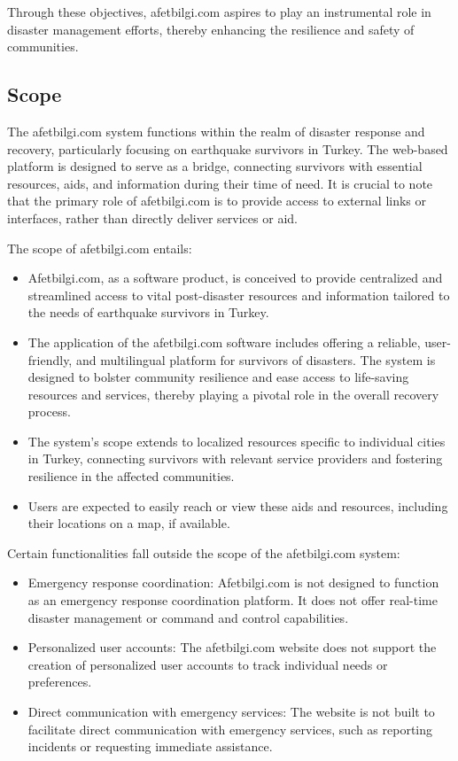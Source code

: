 \documentclass[12pt, letterpaper]{article}
\begin{document}
Through these objectives, afetbilgi.com aspires to play an instrumental role in disaster management efforts, thereby enhancing the resilience and safety of communities.

\subsection{Scope}

The afetbilgi.com system functions within the realm of disaster response and recovery, particularly focusing on earthquake survivors in Turkey. The web-based platform is designed to serve as a bridge, connecting survivors with essential resources, aids, and information during their time of need. It is crucial to note that the primary role of afetbilgi.com is to provide access to external links or interfaces, rather than directly deliver services or aid.

The scope of afetbilgi.com entails:

\begin{itemize}
    \item Afetbilgi.com, as a software product, is conceived to provide centralized and streamlined access to vital post-disaster resources and information tailored to the needs of earthquake survivors in Turkey.
    \item The application of the afetbilgi.com software includes offering a reliable, user-friendly, and multilingual platform for survivors of disasters. The system is designed to bolster community resilience and ease access to life-saving resources and services, thereby playing a pivotal role in the overall recovery process.
    \item The system's scope extends to localized resources specific to individual cities in Turkey, connecting survivors with relevant service providers and fostering resilience in the affected communities.
    \item Users are expected to easily reach or view these aids and resources, including their locations on a map, if available.
\end{itemize}

Certain functionalities fall outside the scope of the afetbilgi.com system:

\begin{itemize}
    \item Emergency response coordination: Afetbilgi.com is not designed to function as an emergency response coordination platform. It does not offer real-time disaster management or command and control capabilities.
    \item Personalized user accounts: The afetbilgi.com website does not support the creation of personalized user accounts to track individual needs or preferences.
    \item Direct communication with emergency services: The website is not built to facilitate direct communication with emergency services, such as reporting incidents or requesting immediate assistance.
\end{itemize}
\end{document}
